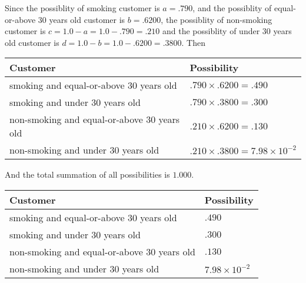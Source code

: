 \documentclass[12pt]{article}
\begin{document}
 
 
 
 
\noindent{}
 
 

Since the possiblity of  %
smoking customer is $ a =  %
.790 $,
and the possiblity of  %
equal-or-above 30 years old customer is $ b =  %
.6200 $,
the possiblity of  %
non-smoking customer is $ c = 1.0 - a = 1.0 -
.790
=  %
.210 $ and the possiblity of  %
under 30 years old
customer is $ d = 1.0 - b = 1.0 -  %
.6200 =  %
.3800  $.
Then
 
\noindent
\begin{tabular}{|l|l|}
\hline
Customer & Possibility \\
\hline
smoking  and  %
equal-or-above 30 years old  &
  $ %
.790 \times  %
.6200 =  %
.490$ \\
\hline
smoking  and  %
under 30 years old &
  $ %
.790 \times  %
.3800 =  %
.300$ \\
\hline
 non-smoking and  %
equal-or-above 30 years old  &
  $ %
.210 \times  %
.6200 =  %
.130$ \\
\hline
 non-smoking and  %
under 30 years old &
  $ %
.210 \times  %
.3800 =  %
7.98 \times 10^{-2}$ \\
\hline
\end{tabular}
 
\noindent
And the total summation of all possibilities is $  %
1.000 $.
 
 
 
 
\noindent{}
 
 

 
 
 
\noindent{}
 
 

 
\noindent
\begin{tabular}{|l|l|}
\hline
Customer & Possibility \\
\hline
smoking  and  %
equal-or-above 30 years old &
  $ %
.490$ \\
\hline
smoking  and  %
under 30 years old &
  $ %
.300$ \\
\hline
 non-smoking and  %
equal-or-above 30 years old &
  $ %
.130$ \\
\hline
 non-smoking and  %
under 30 years old &
  $ %
7.98 \times 10^{-2}$ \\
\hline
\end{tabular}
 
\end{document}
